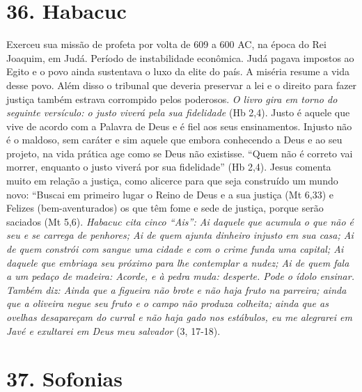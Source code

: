 \documentclass[
]{book}
\begin{document}
\hypertarget{habacuc}{%
\section*{36. Habacuc}\label{habacuc}}

Exerceu sua missão de profeta por volta de 609 a 600 AC, na época do Rei Joaquim, em Judá. Período de instabilidade econômica. Judá pagava impostos ao Egito e o povo ainda sustentava o luxo da elite do país. A miséria resume a vida desse povo. Além disso o tribunal que deveria preservar a lei e o direito para fazer justiça também estrava corrompido pelos poderosos. \emph{O livro gira em torno do seguinte versículo: o justo viverá pela sua fidelidade} (Hb 2,4). Justo é aquele que vive de acordo com a Palavra de Deus e é fiel aos seus ensinamentos. Injusto não é o maldoso, sem caráter e sim aquele que embora conhecendo a Deus e ao seu projeto, na vida prática age como se Deus não existisse. ``Quem não é correto vai morrer, enquanto o justo viverá por sua fidelidade'' (Hb 2,4). Jesus comenta muito em relação a justiça, como alicerce para que seja construído um mundo novo: ``Buscai em primeiro lugar o Reino de Deus e a sua justiça (Mt 6,33) e Felizes (bem-aventurados) os que têm fome e sede de justiça, porque serão saciados (Mt 5,6). \emph{Habacuc cita cinco ``Ais'': Ai daquele que acumula o que não é seu e se carrega de penhores; Ai de quem ajunta dinheiro injusto em sua casa; Ai de quem constrói com sangue uma cidade e com o crime funda uma capital; Ai daquele que embriaga seu próximo para lhe contemplar a nudez; Ai de quem fala a um pedaço de madeira: Acorde, e à pedra muda: desperte. Pode o ídolo ensinar. Também diz: Ainda que a figueira não brote e não haja fruto na parreira; ainda que a oliveira negue seu fruto e o campo não produza colheita; ainda que as ovelhas desapareçam do curral e não haja gado nos estábulos, eu me alegrarei em Javé e exultarei em Deus meu salvador} (3, 17-18).

\hypertarget{sofonias}{%
\section*{37. Sofonias}\label{sofonias}}
\end{document}

